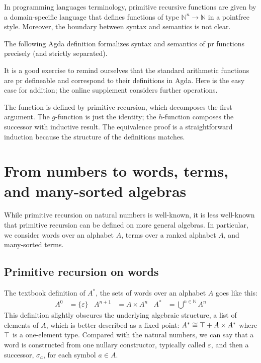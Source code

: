 \documentclass{jfp}
\begin{document}
In programming languages terminology, primitive
recursive functions are given by a domain-specific language that
defines functions of type ${ℕ}^n \to {ℕ}$ in a pointfree
style. Moreover, the boundary between syntax and semantics is not
clear.

The following Agda definition formalizes syntax and semantics of pr
functions precisely (and strictly separated).


It is a good exercise to remind ourselves that the standard arithmetic
functions are pr defineable and correspond to their definitions in
Agda. Here is the easy case for addition; the online supplement
considers further operations. 

The function  is defined by primitive recursion, which
decomposes the first argument. The $g$-function is just the identity;
the $h$-function composes the successor with inductive result.
The equivalence proof is a
straightforward induction because the structure of the definitions
matches.

\section{From numbers to words, terms, and many-sorted algebras}
\label{sec:from-numbers-words}

While primitive recursion on natural numbers is well-known, it is less
well-known that primitive recursion can be defined on more general
algebras. In particular, we consider words over an alphabet $A$, terms
over a ranked alphabet $A$, and many-sorted terms. 

\subsection{Primitive recursion on words}
\label{sec:prim-recurs-words}

The textbook definition of $A^*$, the sets of words over an alphabet $A$ goes like this:
\begin{align*}
  A^0 &= \{ \varepsilon \} & A^{n+1} &= A \times A^n & A^* &=
  \bigcup^{n \in ℕ} A^n
\end{align*}
This definition slightly obscures the underlying algebraic structure, a list of
elements of $A$, which is better described as a fixed point:
$A^*\cong \ATop + A \times A^*$ where $\ATop$ is a one-element type.
Compared with the natural numbers, we can say that a word is
constructed from one nullary constructor, typically called
$\varepsilon$, and then a successor, $\sigma_a$, for each symbol $a\in A$.
\end{document}
